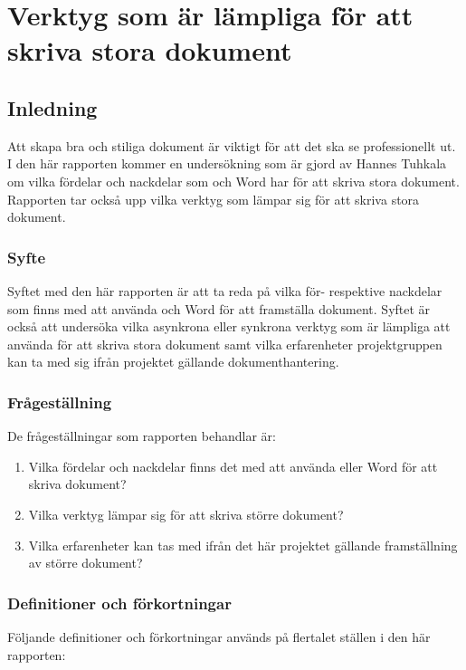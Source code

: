 \chapter{Verktyg som är lämpliga för att skriva stora dokument}
\label{cha:indiv-report-tuhkala}

\section{Inledning}
\label{sec:introduction-tuhkala}
Att skapa bra och stiliga dokument är viktigt för att det ska se professionellt ut. I den här rapporten kommer en undersökning som är gjord av Hannes Tuhkala om vilka fördelar och nackdelar som \latex och Word har för att skriva stora dokument. Rapporten tar också upp vilka verktyg som lämpar sig för att skriva stora dokument.

\subsection{Syfte}
\label{sec:purpose-tuhkala}
Syftet med den här rapporten är att ta reda på vilka för- respektive nackdelar som finns med att använda \latex och Word för att framställa dokument. Syftet är också att undersöka vilka asynkrona eller synkrona verktyg som är lämpliga att använda för att skriva stora dokument samt vilka erfarenheter projektgruppen kan ta med sig ifrån projektet gällande dokumenthantering.

\subsection{Frågeställning}
\label{sec:issue-tuhkala}
De frågeställningar som rapporten behandlar är:

\begin{enumerate}
	\item Vilka fördelar och nackdelar finns det med att använda \latex eller Word för att skriva dokument?
	\item Vilka verktyg lämpar sig för att skriva större dokument?
	\item Vilka erfarenheter kan tas med ifrån det här projektet gällande framställning av större dokument?
\end{enumerate}

\subsection{Definitioner och förkortningar}
Följande definitioner och förkortningar används på flertalet ställen i den här rapporten:

